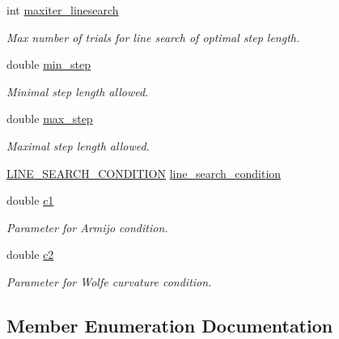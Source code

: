 \begin{DoxyCompactItemize}
int \mbox{\hyperlink{classforte_1_1_l_b_f_g_s___p_a_r_a_m_a1017d0ef8d7837271124b08be046a0bf}{maxiter\+\_\+linesearch}}
\begin{DoxyCompactList}\small\item\em Max number of trials for line search of optimal step length. \end{DoxyCompactList}\item 
double \mbox{\hyperlink{classforte_1_1_l_b_f_g_s___p_a_r_a_m_a907fd1cc91d37628fc5dff3c2ae2fc98}{min\+\_\+step}}
\begin{DoxyCompactList}\small\item\em Minimal step length allowed. \end{DoxyCompactList}\item 
double \mbox{\hyperlink{classforte_1_1_l_b_f_g_s___p_a_r_a_m_a0217fa9bf14c3daf9dc8619efd39eea4}{max\+\_\+step}}
\begin{DoxyCompactList}\small\item\em Maximal step length allowed. \end{DoxyCompactList}\item 
\mbox{\hyperlink{classforte_1_1_l_b_f_g_s___p_a_r_a_m_a363135a6d4f1aa7a5f37a1b5f2a53cc3}{L\+I\+N\+E\+\_\+\+S\+E\+A\+R\+C\+H\+\_\+\+C\+O\+N\+D\+I\+T\+I\+ON}} \mbox{\hyperlink{classforte_1_1_l_b_f_g_s___p_a_r_a_m_a6e6712b25aaf9a87e64cbb1015dd7ddb}{line\+\_\+search\+\_\+condition}}
\item 
double \mbox{\hyperlink{classforte_1_1_l_b_f_g_s___p_a_r_a_m_a9f1cc2c45b81cc90e1fc16d3617cda36}{c1}}
\begin{DoxyCompactList}\small\item\em Parameter for Armijo condition. \end{DoxyCompactList}\item 
double \mbox{\hyperlink{classforte_1_1_l_b_f_g_s___p_a_r_a_m_a41c8926f2b22beb5230b370527585127}{c2}}
\begin{DoxyCompactList}\small\item\em Parameter for Wolfe curvature condition. \end{DoxyCompactList}\end{DoxyCompactItemize}


\subsection{Member Enumeration Documentation}
\mbox{\label{classforte_1_1_l_b_f_g_s___p_a_r_a_m_a363135a6d4f1aa7a5f37a1b5f2a53cc3}} 
